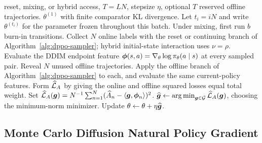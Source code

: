 \begin{algorithm}[tbp]
    \caption{Monte Carlo Diffusion Natural Policy Gradient}
    \begin{algorithmic}[1]
         reset, mixing, or hybrid access, $T=LN$, stepsize $\eta$, optional $T$ reserved offline trajectories.
         $\theta^{(1)}$ with finite comparator KL divergence.
            \STATE Let $t_i=iN$ and write $\theta^{(t_i)}$ for the parameter frozen throughout this batch. Under mixing, first run $b$ burn-in transitions.
            \STATE Collect $N$ online labels with the reset or continuing branch of Algorithm~\ref{alg:dppo-sampler}; hybrid initial-state interaction uses $\nu=\rho$.
            \STATE Evaluate the DDIM endpoint feature $\boldsymbol{\phi}(s,a)=\nabla_\theta\log\pi_\theta(a\mid s)$ at every sampled pair.
                \STATE Reveal $N$ unused offline trajectories. Apply the offline branch of Algorithm~\ref{alg:dppo-sampler} to each, and evaluate the same current-policy features.
                \STATE Form $\widehat{{\mathcal{L}}}_A$ by giving the online and offline squared losses equal total weight.
            \ELSE
                \STATE Set $\widehat{{\mathcal{L}}}_A(\bm{g})=N^{-1}\sum_{n=1}^N(\widehat A_n-\langle\bm{g},\boldsymbol{\phi}_n\rangle)^2$.
            \ENDIF
            \STATE $\widehat{\bm{g}}\gets\operatorname*{arg\,min}_{\bm{g}\in{\mathcal{G}}}\widehat{{\mathcal{L}}}_A(\bm{g})$, choosing the minimum-norm minimizer.
            \STATE Update $\theta\gets\theta+\eta\widehat{\bm{g}}$.
        \ENDFOR
    \end{algorithmic}
\label{alg:dppo-reinforce}
\end{algorithm}





\noindent





\clearpage
\subsection{Monte Carlo Diffusion Natural Policy Gradient}







